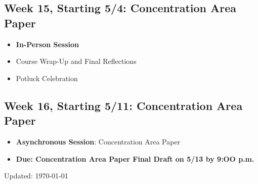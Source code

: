 \documentclass[12pt, letterpaper]{article}
\begin{document}
\subsection*{Week 15, Starting 5/4: Concentration Area Paper}
\begin{itemize}
    \item \textbf{In-Person Session}
    \item Course Wrap-Up and Final Reflections
    \item Potluck Celebration
\end{itemize}

\subsection*{Week 16, Starting 5/11: Concentration Area Paper}
\begin{itemize}
    \item \textbf{Asynchronous Session}: Concentration Area Paper
    \item \textbf{Due: Concentration Area Paper Final Draft on 5/13 by 9:OO p.m.}
\end{itemize}

            \singlespace
            
            

\begin{flushright}
Updated: \today
\end{flushright}

            
\end{document}
